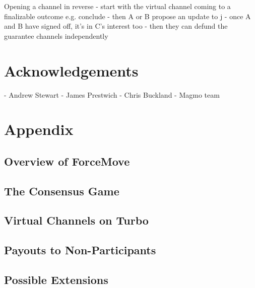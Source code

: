 \documentclass{article}
\theoremstyle{definition}
\begin{document}
Opening a channel in reverse
- start with the virtual channel coming to a finalizable outcome e.g. conclude
- then A or B propose an update to j
- once A and B have signed off, it's in C's interest too
- then they can defund the guarantee channels independently


\section{Acknowledgements}

- Andrew Stewart
- James Prestwich
- Chris Buckland
- Magmo team


\section{Appendix}

\subsection{Overview of ForceMove}
\subsection{The Consensus Game}
\subsection{Virtual Channels on Turbo}
\subsection{Payouts to Non-Participants}
\subsection{Possible Extensions}
\end{document}

